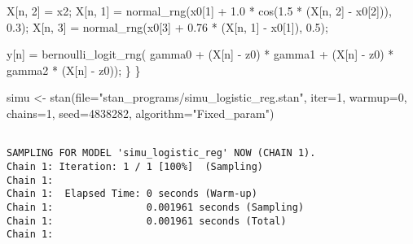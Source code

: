 \documentclass[
  letterpaper,
  DIV=11,
  numbers=noendperiod]{scrartcl}
\newenvironment{Shaded}{\begin{snugshade}}{\end{snugshade}}
\newcommand{\AttributeTok}[1]{\textcolor[rgb]{0.40,0.45,0.13}{#1}}
\newcommand{\DecValTok}[1]{\textcolor[rgb]{0.68,0.00,0.00}{#1}}
\newcommand{\FloatTok}[1]{\textcolor[rgb]{0.68,0.00,0.00}{#1}}
\newcommand{\FunctionTok}[1]{\textcolor[rgb]{0.28,0.35,0.67}{#1}}
\newcommand{\NormalTok}[1]{\textcolor[rgb]{0.00,0.23,0.31}{#1}}
\newcommand{\OtherTok}[1]{\textcolor[rgb]{0.00,0.23,0.31}{#1}}
\newcommand{\StringTok}[1]{\textcolor[rgb]{0.13,0.47,0.30}{#1}}
\begin{document}
\begin{codelisting}
\begin{Shaded}
\begin{Highlighting}[]
\NormalTok{    X[n, }\DecValTok{2}\NormalTok{] = x2;}
\NormalTok{    X[n, }\DecValTok{1}\NormalTok{] = normal\_rng(x0[}\DecValTok{1}\NormalTok{] + }\FloatTok{1.0}\NormalTok{ * cos(}\FloatTok{1.5}\NormalTok{ * (X[n, }\DecValTok{2}\NormalTok{] {-} x0[}\DecValTok{2}\NormalTok{])), }\FloatTok{0.3}\NormalTok{);}
\NormalTok{    X[n, }\DecValTok{3}\NormalTok{] = normal\_rng(x0[}\DecValTok{3}\NormalTok{] + }\FloatTok{0.76}\NormalTok{ * (X[n, }\DecValTok{1}\NormalTok{] {-} x0[}\DecValTok{1}\NormalTok{]), }\FloatTok{0.5}\NormalTok{);}

\NormalTok{    y[n] = bernoulli\_logit\_rng(  gamma0 }
\NormalTok{                               + (X[n] {-} z0\textquotesingle{}) * gamma1}
\NormalTok{                               + (X[n] {-} z0\textquotesingle{}) * gamma2 * (X[n] {-} z0\textquotesingle{})\textquotesingle{});}
\NormalTok{  \}}
\NormalTok{\}}
\end{Highlighting}
\end{Shaded}

\end{codelisting}

\begin{Shaded}
\begin{Highlighting}[]
\NormalTok{simu }\OtherTok{\textless{}{-}} \FunctionTok{stan}\NormalTok{(}\AttributeTok{file=}\StringTok{"stan\_programs/simu\_logistic\_reg.stan"}\NormalTok{,}
             \AttributeTok{iter=}\DecValTok{1}\NormalTok{, }\AttributeTok{warmup=}\DecValTok{0}\NormalTok{, }\AttributeTok{chains=}\DecValTok{1}\NormalTok{,}
             \AttributeTok{seed=}\DecValTok{4838282}\NormalTok{, }\AttributeTok{algorithm=}\StringTok{"Fixed\_param"}\NormalTok{)}
\end{Highlighting}
\end{Shaded}

\begin{verbatim}

SAMPLING FOR MODEL 'simu_logistic_reg' NOW (CHAIN 1).
Chain 1: Iteration: 1 / 1 [100%]  (Sampling)
Chain 1: 
Chain 1:  Elapsed Time: 0 seconds (Warm-up)
Chain 1:                0.001961 seconds (Sampling)
Chain 1:                0.001961 seconds (Total)
Chain 1: 
\end{verbatim}
\end{document}
